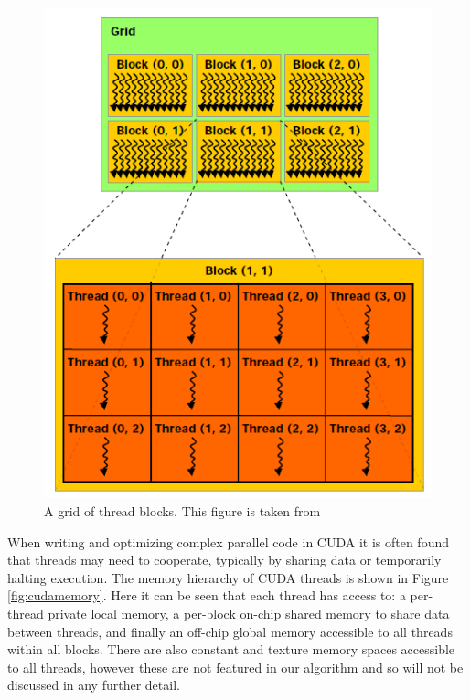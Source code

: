 \begin{figure}[p]
	\centering
		\includegraphics[scale=0.4]{images/cudathreads.PNG}
		\caption{A grid of thread blocks. This figure is taken from \cite{cuda}}
	\label{fig:cudathreads}
\end{figure}

When writing and optimizing complex parallel code in CUDA it is often found that threads may need to cooperate, typically by sharing data or temporarily halting execution. The memory hierarchy of CUDA threads is shown in Figure \ref{fig:cudamemory}. Here it can be seen that each thread has access to: a per-thread private local memory, a per-block on-chip shared memory to share data between threads, and finally an off-chip global memory accessible to all threads within all blocks. There are also constant and texture memory spaces accessible to all threads, however these are not featured in our algorithm and so will not be discussed in any further detail.

